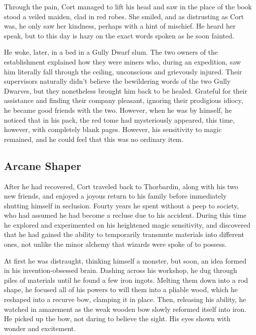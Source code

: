 \documentclass[12pt]{article}
\begin{document}
Through the pain, Cort managed to lift his head and saw in the place of the book
stood a veiled maiden, clad in red robes. She smiled, and as distrusting as Cort
was, he only saw her kindness, perhaps with a hint of mischief. He heard her
speak, but to this day is hazy on the exact words spoken as he soon fainted.

He woke, later, in a bed in a Gully Dwarf slum. The two owners of the
establishment explained how they were miners who, during an expedition, saw him
literally fall through the ceiling, unconscious and grievously injured. Their
supervisors naturally didn't believe the bewildering words of the two Gully
Dwarves, but they nonetheless brought him back to be healed. Grateful for their
assistance and finding their company pleasant, ignoring their prodigious idiocy,
he became good friends with the two. However, when he was by himself, he noticed
that in his pack, the red tome had mysteriously appeared, this time, however,
with completely blank pages. However, his sensitivity to magic remained, and he
could feel that this was no ordinary item.

\subsection{Arcane Shaper}

After he had recovered, Cort traveled back to Thorbardin, along with his two new
friends, and enjoyed a joyous return to his family before immediately shutting
himself in seclusion. Fourty years he spent without a peep to society, who had
assumed he had become a recluse due to his accident. During this time he
explored and experimented on his heightened magic sensitivity, and discovered
that he had gained the ability to temporarily transmute materials into different
ones, not unlike the minor alchemy that wizards were spoke of to possess.

At first he was distraught, thinking himself a monster, but soon, an idea formed
in his invention-obsessed brain. Dashing across his workshop, he dug through
piles of materials until he found a few iron ingots. Melting them down into
a rod shape, he focused all of his powers to will them into a pliable wood,
which he reshaped into a recurve bow, clamping it in place. Then, releasing his
ability, he watched in amazement as the weak wooden bow slowly reformed itself
into iron. He picked up the bow, not daring to believe the sight. His eyes shown
with wonder and excitement.
\end{document}

